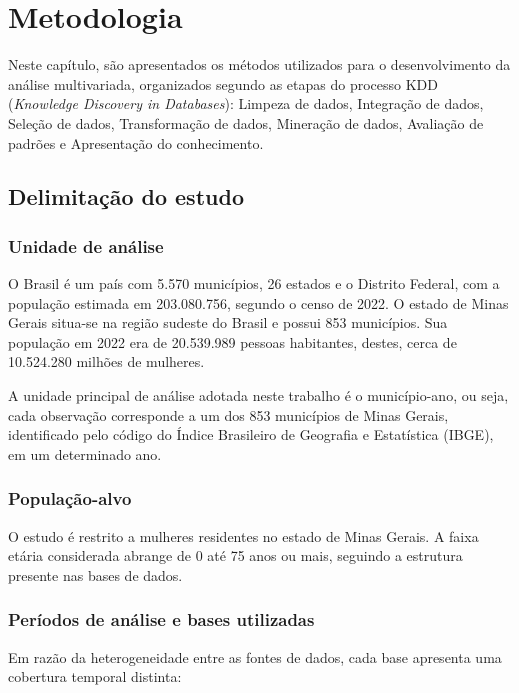 \chapter{Metodologia}

Neste capítulo, são apresentados os métodos utilizados para o desenvolvimento da análise multivariada, organizados segundo as etapas do processo KDD (\textit{Knowledge Discovery in Databases}): Limpeza de dados, Integração de dados, Seleção de dados, Transformação de dados, Mineração de dados, Avaliação de padrões e Apresentação do conhecimento.

\section{Delimitação do estudo}

\subsection{Unidade de análise}
O Brasil é um país com 5.570 municípios, 26 estados e o Distrito Federal, com a população estimada em 
203.080.756, segundo o censo de 2022. O estado de Minas Gerais situa-se na região sudeste do Brasil e possui 853 municípios. Sua população em 2022 era de 
20.539.989 pessoas habitantes, destes, cerca de 10.524.280 milhões de mulheres. 

A unidade principal de análise adotada neste trabalho é o município-ano, ou seja, cada observação corresponde a um dos 853 municípios de Minas Gerais, identificado pelo código do Índice Brasileiro de Geografia e Estatística (IBGE), em um determinado ano. 

\subsection{População-alvo}

O estudo é restrito a mulheres residentes no estado de Minas Gerais. A faixa etária considerada abrange de 0 até 75 anos ou mais, seguindo a estrutura presente nas bases de dados.

\subsection{Períodos de análise e bases utilizadas}

Em razão da heterogeneidade entre as fontes de dados, cada base apresenta uma cobertura temporal distinta:

